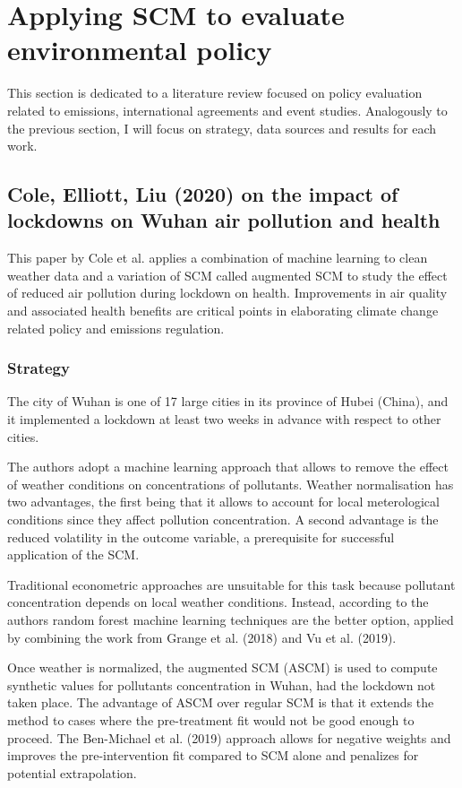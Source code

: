 \documentclass[12pt,a4paper,draft]{article}
\begin{document}
\section{Applying SCM to evaluate environmental policy}
This section is dedicated to a literature review focused on policy evaluation related 
to emissions, international agreements and event studies. Analogously to the previous 
section, I will focus on strategy, data sources and results for each work. 


\subsection{Cole, Elliott, Liu (2020) on the impact of lockdowns on Wuhan air pollution and health}
This paper by Cole et al. applies a combination of machine learning 
to clean weather data and a variation of SCM called augmented SCM to study the effect 
of reduced air pollution during lockdown on health. 
Improvements in air quality and associated health benefits are critical points in 
elaborating climate change related policy and emissions regulation. 


\subsubsection*{Strategy} %
The city of Wuhan is one of 17 large cities in its province of Hubei (China), and it 
implemented a lockdown at least two weeks in advance with respect to other cities. 

The authors adopt a machine learning approach that allows to remove the effect of 
weather conditions on concentrations of pollutants. 
Weather normalisation has two advantages, the first being that it allows
to account for local meterological conditions since they affect pollution 
concentration. A second advantage is the reduced volatility in the outcome variable, 
a prerequisite for successful application of the SCM.

Traditional econometric approaches are unsuitable for this task
because pollutant concentration depends on local weather conditions. 
Instead, according to the authors random forest machine learning techniques are 
the better option, applied by combining the work from Grange et al. (2018) and Vu et 
al. (2019).

Once weather is normalized, the augmented SCM (ASCM) is used to compute synthetic 
values for pollutants concentration in Wuhan, had the lockdown not taken place. The 
advantage of ASCM over regular SCM is that it extends the method to cases where 
the pre-treatment fit would not be good enough to proceed. The Ben-Michael et al. (2019) 
approach allows for negative weights and improves the pre-intervention fit compared to 
SCM alone and penalizes for potential extrapolation. 
\end{document}
